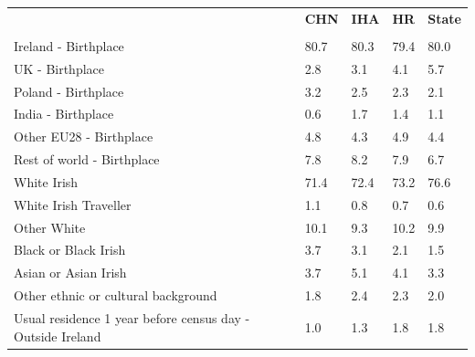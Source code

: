 \documentclass{article}
\begin{document}
\pagebreak
\begin{table}[h]	
\centering
		\begin{tabular}{KTTTT}
  \hline
& \textbf{CHN} & \textbf{IHA} & \textbf{HR}& \textbf{State}\\ 
  \hline
    \\ 
    \hline
Ireland - Birthplace & 80.7& 80.3& 79.4& 80.0\\
UK - Birthplace & 2.8& 3.1& 4.1& 5.7\\
Poland - Birthplace & 3.2& 2.5& 2.3& 2.1\\
India - Birthplace & 0.6& 1.7& 1.4& 1.1\\
Other EU28 - Birthplace & 4.8& 4.3& 4.9& 4.4\\
Rest of world - Birthplace & 7.8& 8.2& 7.9& 6.7\\
    \hline
White Irish & 71.4& 72.4& 73.2& 76.6\\
White Irish Traveller & 1.1& 0.8& 0.7& 0.6\\
Other White & 10.1&  9.3& 10.2&  9.9\\
Black or Black Irish & 3.7& 3.1& 2.1& 1.5\\
Asian or Asian Irish & 3.7& 5.1& 4.1& 3.3\\
Other ethnic or cultural background & 1.8& 2.4& 2.3& 2.0\\
    \hline
Usual residence 1 year before census day - Outside Ireland & 1.0& 1.3& 1.8& 1.8\\


\end{tabular}
\end{table}
\end{document}

